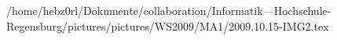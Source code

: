 /home/hebz0rl/Dokumente/collaboration/Informatik---Hochschule-Regensburg/pictures/pictures/WS2009/MA1/2009.10.15-IMG2.tex